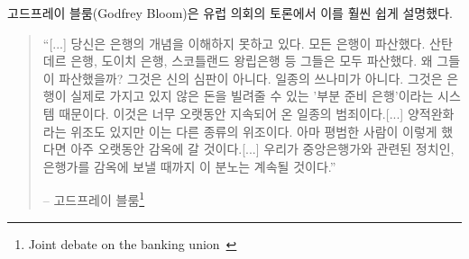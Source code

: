 \begin{comment}
	Godfrey Bloom, addressing the European Parliament during a joint
	debate, said it way better than I ever could:
\end{comment}
고드프레이 블룸(Godfrey Bloom)은 유럽 의회의 토론에서 이를 훨씬 쉽게 설명했다.

\begin{comment}
	\begin{quotation}\begin{samepage}
			\enquote{[...] you do not really understand the concept of banking. All the
				banks are broke. Bank Santander, Deutsche Bank, Royal Bank of
				Scotland --- they're all broke! And why are they broke? It isn't an
				act of God. It isn't some sort of tsunami. They're broke because we
				have a system called `fractional reserve banking' which means that
				banks can lend money that they don't actually have! It's a criminal
				scandal and it's been going on for too long. [...]
				We have counterfeiting --- sometimes called quantitative
				easing --- but counterfeiting by any other name. The artificial
				printing of money which, if any ordinary person did, they'd go to
				prison for a very long time [...] and until we start sending
				bankers --- and I include central bankers and politicians --- to
				prison for this outrage it will continue.}
			\begin{flushright} -- Godfrey Bloom\footnote{Joint debate on the
					banking union~\cite{godfrey-bloom}}
	\end{flushright}\end{samepage}\end{quotation}
\end{comment}
\begin{quotation}\begin{samepage}
		\enquote{[...] 당신은 은행의 개념을 이해하지 못하고 있다. 
			모든 은행이 파산했다. 산탄데르 은행, 도이치 은행, 스코틀랜드 왕립은행 등 그들은 모두 파산했다.
			왜 그들이 파산했을까? 그것은 신의 심판이 아니다. 일종의 쓰나미가 아니다. 
			그것은 은행이 실제로 가지고 있지 않은 돈을 빌려줄 수 있는
			'부분 준비 은행'이라는 시스템 때문이다. 
			이것은 너무 오랫동안 지속되어 온 일종의 범죄이다.[...]	
			양적완화라는 위조도 있지만 이는 다른 종류의 위조이다.
			아마 평범한 사람이 이렇게 했다면 아주 오랫동안 감옥에 갈 것이다.[...] 
			우리가 중앙은행가와 관련된 정치인, 은행가를 감옥에 보낼 때까지
			이 분노는 계속될 것이다.}
		\begin{flushright} -- 고드프레이 블룸\footnote{Joint debate on the
				banking union~\cite{godfrey-bloom}}
\end{flushright}\end{samepage}\end{quotation}

